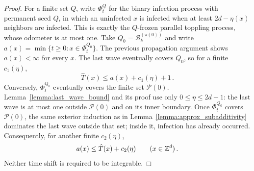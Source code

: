 \documentclass[12pt]{amsart}
\begin{document}
\begin{proof}
For a finite set $Q$, write $\Phi_t^Q$ for the binary infection process with permanent seed $Q$, in which an uninfected $x$ is infected when at least $2d-\eta(x)$ neighbors are infected. This is exactly the $Q$-frozen parallel toppling process, whose odometer is at most one. Take $Q_0=\mathcal B^{(\pi(0))}_k$ and write $a(x)=\min\{t\geq0:x\in\Phi_t^{Q_0}\}$. The previous propagation argument shows $a(x)<\infty$ for every $x$. The last wave eventually covers $Q_0$, so for a finite $c_1(\eta)$,
\begin{equation*}
 \hat T(x)\leq a(x)+c_1(\eta)+1\,.
\end{equation*}
Conversely, $\Phi_t^{Q_0}$ eventually covers the finite set $\mathcal P(0)$. Lemma~\ref{lemma:last_wave_bound} and its proof use only $0\leq\eta\leq2d-1$: the last wave is at most one outside $\mathcal P(0)$ and on its inner boundary. Once $\Phi_t^{Q_0}$ covers $\mathcal P(0)$, the same exterior induction as in Lemma~\ref{lemma:approx_subadditivity} dominates the last wave outside that set; inside it, infection has already occurred. Consequently, for another finite $c_2(\eta)$,
\begin{equation*}
 a(x)\leq\hat T(x)+c_2(\eta)\qquad(x\in\mathbb{Z}^d)\,.
\end{equation*}
Neither time shift is required to be integrable.


\end{proof}
\end{document}
